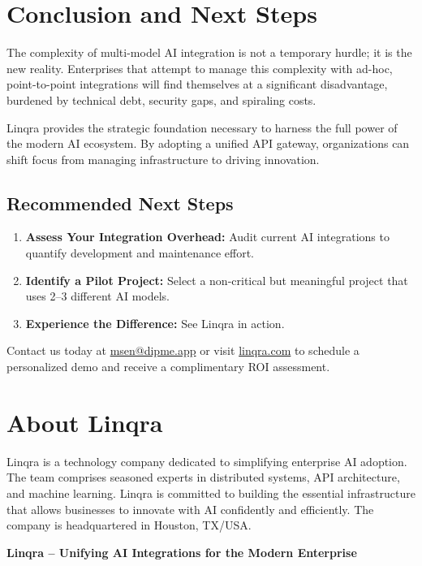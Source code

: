 \documentclass[11pt,a4paper]{article}
\begin{document}
\newpage
\section{Conclusion and Next Steps}
The complexity of multi-model AI integration is not a temporary hurdle; it is the new reality. Enterprises that attempt to manage this complexity with ad-hoc, point-to-point integrations will find themselves at a significant disadvantage, burdened by technical debt, security gaps, and spiraling costs.

Linqra provides the strategic foundation necessary to harness the full power of the modern AI ecosystem. By adopting a unified API gateway, organizations can shift focus from managing infrastructure to driving innovation.

\subsection*{Recommended Next Steps}
\begin{enumerate}[leftmargin=*]
  \item \textbf{Assess Your Integration Overhead:} Audit current AI integrations to quantify development and maintenance effort.
  \item \textbf{Identify a Pilot Project:} Select a non-critical but meaningful project that uses 2--3 different AI models.
  \item \textbf{Experience the Difference:} See Linqra in action.
\end{enumerate}

Contact us today at \href{mailto:msen@dipme.app}{msen@dipme.app} or visit \href{https://linqra.com}{linqra.com} to schedule a personalized demo and receive a complimentary ROI assessment.

\newpage
\section{About Linqra}
Linqra is a technology company dedicated to simplifying enterprise AI adoption. The team comprises seasoned experts in distributed systems, API architecture, and machine learning. Linqra is committed to building the essential infrastructure that allows businesses to innovate with AI confidently and efficiently. The company is headquartered in Houston, TX/USA.

\vspace{0.5cm}
\begin{center}
\textbf{Linqra -- Unifying AI Integrations for the Modern Enterprise}
\end{center}
\end{document}

